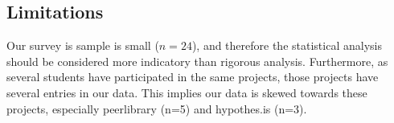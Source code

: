 \subsection{Limitations}

Our survey is sample is small ($n=24$), and therefore the statistical analysis should be considered more indicatory than rigorous analysis. Furthermore, as several students have participated in the same projects, those projects have several entries in our data. This implies our data is skewed towards these projects, especially peerlibrary (n=5) and hypothes.is (n=3).